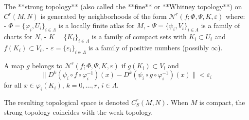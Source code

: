 The **strong topology** (also called the **fine** or **Whitney topology**) on $C^r(M,N)$ is generated by neighborhoods of the form $\mathcal{N}^r(f; \Phi, \Psi, K, \varepsilon)$ where:
- $\Phi = \{\varphi_i, U_i\}_{i \in \Lambda}$ is a locally finite atlas for $M$,
- $\Psi = \{\psi_i, V_i\}_{i \in \Lambda}$ is a family of charts for $N$,
- $K = \{K_i\}_{i \in \Lambda}$ is a family of compact sets with $K_i \subset U_i$ and $f(K_i) \subset V_i$,
- $\varepsilon = \{\varepsilon_i\}_{i \in \Lambda}$ is a family of positive numbers (possibly $\infty$).

A map $g$ belongs to $\mathcal{N}^r(f; \Phi, \Psi, K, \varepsilon)$ if $g(K_i) \subset V_i$ and
$$\| D^k(\psi_i \circ f \circ \varphi_i^{-1})(x) - D^k(\psi_i \circ g \circ \varphi_i^{-1})(x) \| < \varepsilon_i$$
for all $x \in \varphi_i(K_i)$, $k = 0, \ldots, r$, $i \in \Lambda$.

The resulting topological space is denoted $C^r_S(M,N)$. When $M$ is compact, the strong topology coincides with the weak topology.
